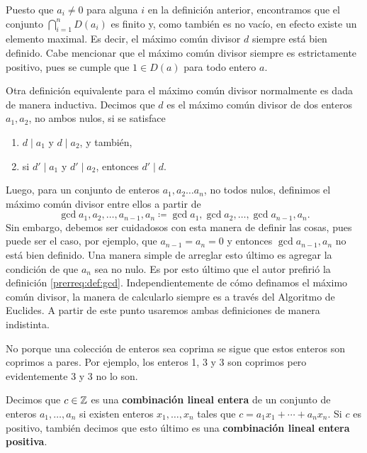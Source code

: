 Puesto que $a_i \neq 0$ para alguna $i$ en la definición anterior, encontramos que el conjunto
$\bigcap_{i=1}^{n}D(a_i)$ es finito y, como también es no vacío, en efecto existe un elemento maximal.
Es decir, el máximo común divisor $d$ siempre está bien definido. Cabe mencionar que el máximo común
divisor siempre es estrictamente positivo, pues se cumple que $1 \in D(a)$ para todo entero $a$.

Otra definición equivalente para el máximo común divisor normalmente es dada de manera inductiva.
Decimos que $d$ es el máximo común divisor de dos enteros $a_1, a_2$, no ambos nulos, si se
satisface
\begin{enumerate}
	\item $d \mid a_1$ y $d \mid a_2$, y también,
	\item si $d' \mid a_1$ y $d' \mid a_2$, entonces $d' \mid d$.
\end{enumerate}
Luego, para un conjunto de enteros $a_1, a_2 \ldots a_n$, no todos nulos, definimos el máximo común
divisor entre ellos a partir de
\begin{equation*}
	\gcd{a_1, a_2, \ldots, a_{n-1}, a_n} \coloneq \gcd{a_1, \gcd{a_2, \ldots, \gcd{a_{n-1}, a_n}}}.
\end{equation*}
Sin embargo, debemos ser cuidadosos con esta manera de definir las cosas, pues puede ser el caso,
por ejemplo, que $a_{n-1} = a_n = 0$ y entonces $\gcd{a_{n-1}, a_n}$ no está bien definido. Una
manera simple de arreglar esto último es agregar la condición de que $a_n$ sea no nulo. Es por esto
último que el autor prefirió la definición \ref{prerreq:def:gcd}. Independientemente de cómo
definamos el máximo común divisor, la manera de calcularlo siempre es a través del Algoritmo de
Euclides. A partir de este punto usaremos ambas definiciones de manera indistinta.

\begin{observation}
	No porque una colección de enteros sea coprima se sigue que estos enteros son coprimos a pares.
	Por ejemplo, los enteros 1, 3 y 3 son coprimos pero evidentemente 3 y 3 no lo son.
\end{observation}

\begin{definition}
	Decimos que $c \in \mathbb{Z}$ es una \textbf{combinación lineal entera} de un conjunto de enteros $a_1, \ldots,
	a_n$ si existen enteros $x_1, \ldots, x_n$ tales que $c = a_1x_1 + \cdots + a_nx_n$. Si $c$ es
	positivo, también decimos que esto último es una \textbf{combinación lineal entera positiva}.
\end{definition}


